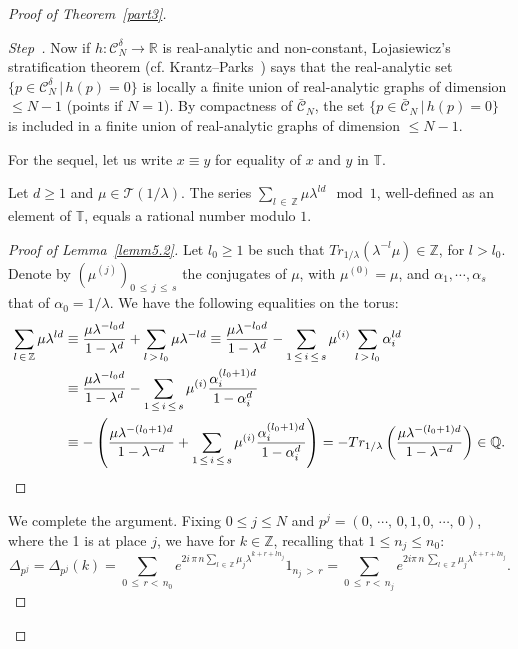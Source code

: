 \documentclass[AHL,Unicode,longabstracts,published]{cedram}
\newcommand{\Tbb}{\mathbb T}
\newcommand{\Rbb}{\mathbb R}
\newcommand{\Qbb}{\mathbb Q}
\newcommand{\Zbb}{\mathbb Z}
\newcommand{\Ccl}{\mathcal{C}}
\newcommand{\Tcl}{\mathcal{T}}
\newcounter{stepcount}
\newenvironment{step}{\refstepcounter{stepcount}\begin{proof}[Step~\thestepcount]}{\let\qed\relax\end{proof}}
\begin{document}
\begin{proof}[{Proof of Theorem~\ref{part3}}]
\begin{step}
Now if $h:{\Ccl}^{\delta}_N\rightarrow\Rbb$ is real-analytic and non-constant, Lojasiewicz's stratification theorem (cf. Krantz--Parks~\cite[Theorem~5.2.3]{krantzpark}) says that the real-analytic set $\{p\in{\Ccl}^{\delta}_N\,|\,h(p)=0\}$ is locally a finite union of real-analytic graphs of dimension $\leq N-1$ (points if $N=1$). By compactness of $\bar{\Ccl}_N$, the set $\{p\in\bar{\Ccl}_N\,|\,h(p)=0\}$ is included in a finite union of real-analytic graphs of dimension $\leq N-1$.



For the sequel, let us write $x\equiv y$ for equality of $x$ and $y$ in $\Tbb$.

\begin{lemm}\label{lemm5.2}
Let $d\geq1$ and $\mu\in{\Tcl}(1/\lambda)$. The series $\sum_{l\,\in\,\Zbb}\mu\lambda^{ld}\mod1$, well-defined as an element of $\Tbb$, equals a rational number modulo $1$.
\end{lemm}
\pagebreak
\begin{proof}[{Proof of Lemma~\ref{lemm5.2}}]
Let $l_0\geq1$ be such that $Tr_{1/\lambda}(\lambda^{-l}\mu)\in\Zbb$, for $l>l_0$. Denote by $(\mu^{(j)})_{0\,\leq\,j\,\leq\,s}$ the conjugates of $\mu$, with $\mu^{(0)}=\mu$, and $\alpha_1,\cdots,\alpha_{s}$ that of $\alpha_0=1/\lambda$. We have the following equalities on the torus:
\begin{align*}
\sum_{l\,\in\,\Zbb}\mu\lambda^{ld}&\equiv\frac{\mu\lambda^{-l_0d}}{1-\lambda^d}+\sum_{l\,>\,l_0}\mu\lambda^{-ld}\equiv\frac{\mu\lambda^{-l_0d}}{1-\lambda^d}-\sum_{1\,\leq\,i\,\leq\,s}\mu^{(i)}\,\sum_{l\,>\,l_0}\alpha_i^{ld}\\
&\equiv\frac{\mu\lambda^{-l_0d}}{1-\lambda^d}-\sum_{1\,\leq\,i\,\leq\,s}\mu^{(i)}\frac{\alpha_i^{(l_0+1)d}}{1-\alpha_i^d}\\
&\equiv-\left({\frac{\mu\lambda^{-(l_0+1)d}}{1-\lambda^{-d}}+\sum_{1\,\leq\,i\,\leq\,s}\mu^{(i)}\frac{\alpha_i^{(l_0+1)d}}{1-\alpha_i^d}}\right)=-Tr_{1/\lambda}\left({\frac{\mu\lambda^{-(l_0+1)d}}{1-\lambda^{-d}}}\right)\in\Qbb.\qedhere
\end{align*}
\end{proof}



We complete the argument. Fixing $0\leq j\leq N$ and $p^{j}=(0,\,\cdots,\,0,1,0,\,\cdots,\,0)$, where the 1 is at place $j$, we have for $k\in\Zbb$, recalling that $1\leq n_j\leq n_0$:
\[
\Delta_{p^j}=\Delta_{p^j}(k)=\sum_{0\,\leq \,r<\, n_0}e^{2i\,\pi\,n\sum_{l\,\in\,\Zbb}\mu_j\lambda^{k+r+ln_j}}1_{n_j\,>\,r}=\sum_{0\,\leq\,r<\,n_j}e^{2i\pi\,n\,\sum_{l\,\in\,\Zbb}\mu_j\lambda^{k+r+ln_j}}.
\]



\end{step}
\end{proof}
\end{document}

